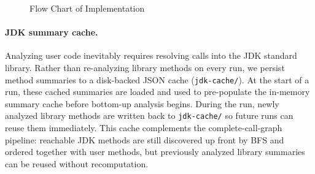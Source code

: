 \begin{figure}[H]
\caption{Flow Chart of Implementation}
\label{fig:implement-flowchart}
\end{figure}

\paragraph{JDK summary cache.}
Analyzing user code inevitably requires resolving calls into the JDK standard library.
Rather than re-analyzing library methods on every run, we persist method summaries to a disk-backed JSON cache (\texttt{jdk-cache/}).
At the start of a run, these cached summaries are loaded and used to pre-populate the in-memory summary cache before bottom-up analysis begins.
During the run, newly analyzed library methods are written back to \texttt{jdk-cache/} so future runs can reuse them immediately.
This cache complements the complete-call-graph pipeline: reachable JDK methods are still discovered up front by BFS and ordered together with user methods, but previously analyzed library summaries can be reused without recomputation.
